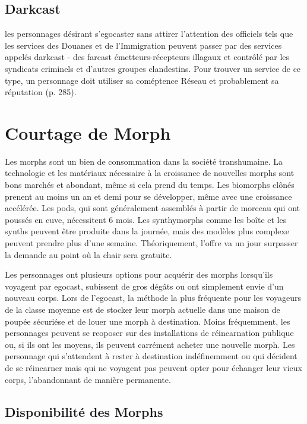 \subsection{Darkcast} 

les personnages désirant s'egocaster sans attirer l'attention des officiels tels que les services des Douanes et de l'Immigration peuvent passer par des services appelés darkcast - des farcast émetteurs-récepteurs illagaux et contrôlé par les syndicats criminels et d'autres groupes clandestins. Pour trouver un service de ce type, un personnage doit utiliser sa coméptence Réseau et probablement sa réputation (p. 285). 

\section{Courtage de Morph} 

Les morphs sont un bien de consommation dans la société transhumaine. La technologie et les matériaux nécessaire à la croissance de nouvelles morphs sont bons marchés et abondant, même si cela prend du temps. Les biomorphs clônés prenent au moins un an et demi pour se développer, même avec une croissance accélérée. Les pods, qui sont généralement assemblés à partir de morceau qui ont poussés en cuve, nécessitent 6 mois. Les synthymorphs comme les boîte et les synths peuvent être produite dans la journée, mais des modèles plus complexe peuvent prendre plus d'une semaine. Théoriquement, l'offre va un jour surpasser la demande au point où la chair sera gratuite. 

Les personnages ont plusieurs options pour acquérir des morphs lorsqu'ils voyagent par egocast, subissent de gros dégâts ou ont simplement envie d'un nouveau corps. Lors de l'egocast, la méthode la plus fréquente pour les voyageurs de la classe moyenne est de stocker leur morph actuelle dans une maison de poupée sécuriése et de louer une morph à destination. Moins fréquemment, les personnages peuvent se reoposer sur des installations de réincarnation publique ou, si ils ont les moyens, ils peuvent carrément acheter une nouvelle morph. Les personnage qui s'attendent à rester à destination indéfinemment ou qui décident de se réincarner mais qui ne voyagent pas peuvent opter pour échanger leur vieux corps, l'abandonnant de manière permanente. 

\subsection{Disponibilité des Morphs} 

